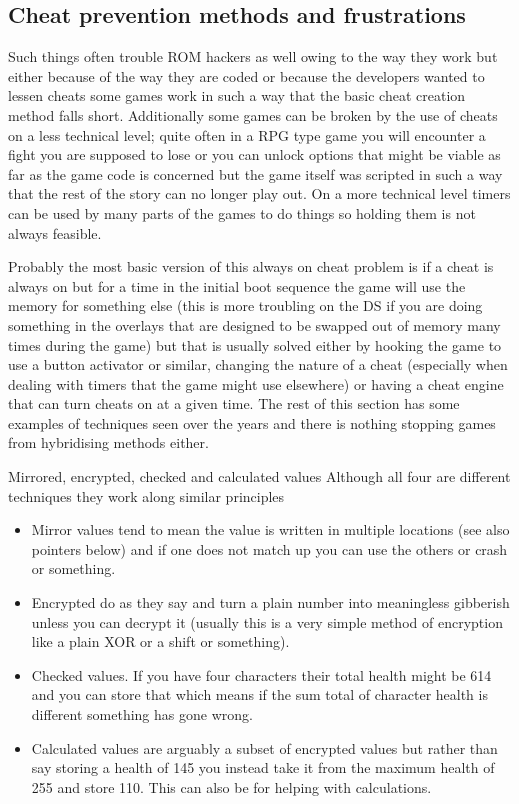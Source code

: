 \documentclass[
]{book}
\providecommand{\tightlist}{%
  \setlength{\itemsep}{0pt}\setlength{\parskip}{0pt}}
\begin{document}
\hypertarget{cheat-prevention-methods-and-frustrations}{%
\subsection{Cheat prevention methods and frustrations}\label{cheat-prevention-methods-and-frustrations}}

Such things often trouble ROM hackers as well owing to the way they work but either because of the way they are coded or because the developers wanted to lessen cheats some games work in such a way that the basic cheat creation method falls short. Additionally some games can be broken by the use of cheats on a less technical level; quite often in a RPG type game you will encounter a fight you are supposed to lose or you can unlock options that might be viable as far as the game code is concerned but the game itself was scripted in such a way that the rest of the story can no longer play out. On a more technical level timers can be used by many parts of the games to do things so holding them is not always feasible.

Probably the most basic version of this always on cheat problem is if a cheat is always on but for a time in the initial boot sequence the game will use the memory for something else (this is more troubling on the DS if you are doing something in the overlays that are designed to be swapped out of memory many times during the game) but that is usually solved either by hooking the game to use a button activator or similar, changing the nature of a cheat (especially when dealing with timers that the game might use elsewhere) or having a cheat engine that can turn cheats on at a given time. The rest of this section has some examples of techniques seen over the years and there is nothing stopping games from hybridising methods either.

Mirrored, encrypted, checked and calculated values Although all four are different techniques they work along similar principles

\begin{itemize}
\tightlist
\item
  Mirror values tend to mean the value is written in multiple locations (see also pointers below) and if one does not match up you can use the others or crash or something.
\item
  Encrypted do as they say and turn a plain number into meaningless gibberish unless you can decrypt it (usually this is a very simple method of encryption like a plain XOR or a shift or something).
\item
  Checked values. If you have four characters their total health might be 614 and you can store that which means if the sum total of character health is different something has gone wrong.
\item
  Calculated values are arguably a subset of encrypted values but rather than say storing a health of 145 you instead take it from the maximum health of 255 and store 110. This can also be for helping with calculations.
\end{itemize}
\end{document}
